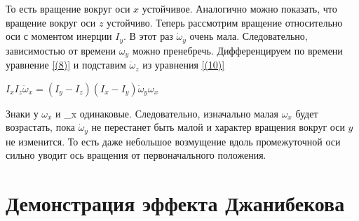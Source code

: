 \documentclass{article}
\begin{document}
То есть вращение вокруг оси $x$ устойчивое. Аналогично можно показать, что вращение вокруг оси $z$ устойчиво. 
Теперь рассмотрим вращение относительно оси с моментом инерции $I_y$. В этот раз $\displaystyle {\dot {\omega }}_{y}$ очень мала. Следовательно, зависимостью от времени
$\omega_y$ можно пренебречь. Дифференцируем по времени уравнение \ref{(8)} и подставим $\displaystyle {\ddot {\omega }}_{z}$ из уравнения \ref{(10)}

\begin{center}
$I_xI_z{\displaystyle {\ddot {\omega }}_{x}} = (I_y-I_z)(I_x-I_y){\displaystyle {\ddot {\omega }}_{y}}\omega_x$
\end{center}

Знаки у $\omega_x$ и {\displaystyle {\ddot {\omega }}_{x}} одинаковые. Следовательно, изначально малая $\omega_x$ будет возрастать, пока $\displaystyle {\dot {\omega }}_{y}$ не перестанет быть малой и характер вращения вокруг оси $y$ не изменится. То есть даже небольшое возмущение вдоль промежуточной оси сильно уводит ось вращения от первоначального положения. 

\section{Демонстрация эффекта Джанибекова}
\end{document}
